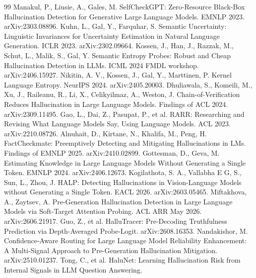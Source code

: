 \documentclass[10pt]{article}
\begin{document}
\begin{thebibliography}{99}
 Manakul, P., Liusie, A., Gales,
M. SelfCheckGPT: Zero-Resource Black-Box Hallucination Detection for
Generative Large Language Models. EMNLP 2023. arXiv:2303.08896.
 Kuhn, L., Gal, Y., Farquhar, S.
Semantic Uncertainty: Linguistic Invariances for Uncertainty Estimation in
Natural Language Generation. ICLR 2023. arXiv:2302.09664.
 Kossen, J., Han, J.,
Razzak, M., Schut, L., Malik, S., Gal, Y. Semantic Entropy Probes: Robust
and Cheap Hallucination Detection in LLMs. ICML 2024 FMDL workshop.
arXiv:2406.15927.
 Nikitin, A. V., Kossen, J.,
Gal, Y., Marttinen, P. Kernel Language Entropy. NeurIPS 2024.
arXiv:2405.20003.
 Dhuliawala, S., Komeili, M., Xu, J.,
Raileanu, R., Li, X., Celikyilmaz, A., Weston, J. Chain-of-Verification
Reduces Hallucination in Large Language Models. Findings of ACL 2024.
arXiv:2309.11495.
 Gao, L., Dai, Z., Pasupat, P., et al.
RARR: Researching and Revising What Language Models Say, Using Language
Models. ACL 2023. arXiv:2210.08726.
 Alnuhait, D., Kirtane, N.,
Khalifa, M., Peng, H. FactCheckmate: Preemptively Detecting and Mitigating
Hallucinations in LMs. Findings of EMNLP 2025. arXiv:2410.02899.
 Gottesman, D., Geva, M. Estimating
Knowledge in Large Language Models Without Generating a Single Token.
EMNLP 2024. arXiv:2406.12673.
 Kogilathota, S. A., Vallabha E G,
S., Sun, L., Zhou, J. HALP: Detecting Hallucinations in Vision-Language
Models without Generating a Single Token. EACL 2026. arXiv:2603.05465.
 Miftakhova, A.,
Zaytsev, A. Pre-Generation Hallucination Detection in Large Language Models
via Soft-Target Attention Probing. ACL ARR May 2026. arXiv:2606.21917.
 Guo, Z., et al. HalluTracer:
Pre-Decoding Truthfulness Prediction via Depth-Averaged Probe-Logit.
arXiv:2608.16353.
 Nandakishor, M.
Confidence-Aware Routing for Large Language Model Reliability Enhancement:
A Multi-Signal Approach to Pre-Generation Hallucination Mitigation.
arXiv:2510.01237.
 Tong, C., et al. HaluNet: Learning
Hallucination Risk from Internal Signals in LLM Question Answering.

\end{thebibliography}
\end{document}
